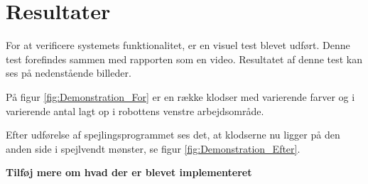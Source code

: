\chapter{Resultater}\label{chap:Resultater}
For at verificere systemets funktionalitet, er en visuel test blevet udført.
Denne test forefindes sammen med rapporten som en video.
Resultatet af denne test kan ses på nedenstående billeder. 

På figur \ref{fig:Demonstration_For} er en række klodser med varierende farver og i varierende antal lagt op i robottens venstre arbejdsområde.

Efter udførelse af spejlingsprogrammet ses det, at klodserne nu ligger på den anden side i spejlvendt mønster, se figur \ref{fig:Demonstration_Efter}.


\textbf{Tilføj mere om hvad der er blevet implementeret}
